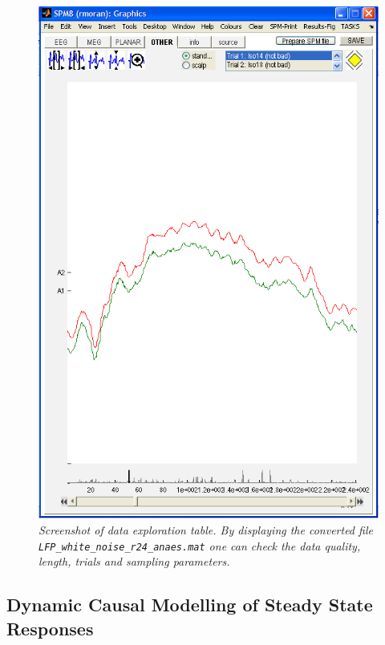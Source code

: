 \begin{figure}
\begin{center}
\includegraphics[width=140mm]{dcm_ssr/fig1}
\caption{\em Screenshot of data exploration table. By displaying the converted file \texttt{LFP\_white\_noise\_r24\_anaes.mat} one can check the data quality, length, trials and sampling parameters. \label{dcm_ssr:fig1}}
\end{center}
\end{figure}

\subsection{Dynamic Causal Modelling of Steady State Responses}

